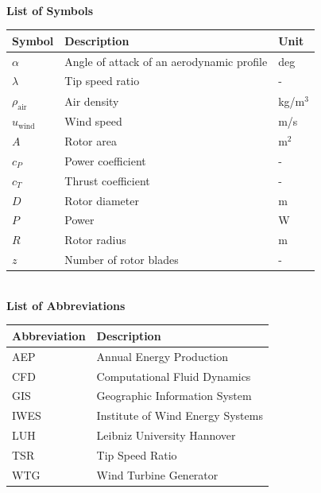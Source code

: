 
~\\[1.5cm]
{\huge\textbf{List of Symbols}}
\vspace{1.5cm}

\begin{tabularx}{0.9\textwidth}{l X l}
	\textbf{Symbol} & \textbf{Description} & \textbf{Unit} \\
	\hline
	$\alpha$                & Angle of attack of an aerodynamic profile       & deg     \\
	$\lambda$              & Tip speed ratio          & -        \\
	$\rho_{\text{air}}$    & Air density                                    & kg/m$^3$ \\
	$u_{\text{wind}}$      & Wind speed                           & m/s      \\
	$A$                    & Rotor area              & m$^2$    \\
	$c_P$                  & Power coefficient                         & -        \\
	$c_T$                  & Thrust coefficient                            & -        \\
	$D$                    & Rotor diameter                            & m \\
	$P$                    & Power        & W        \\
	$R$                    & Rotor radius                                 & m        \\
	$z$                    & Number of rotor blades                          & -        \\
\end{tabularx}

\clearpage


~\\[1.5cm]
{\huge\textbf{List of Abbreviations}}
\vspace{1.5cm}

\begin{tabularx}{0.9\textwidth}{l X}
	\textbf{Abbreviation} & \textbf{Description} \\
	\hline
	AEP & Annual Energy Production \\
	CFD & Computational Fluid Dynamics \\
	GIS & Geographic Information System \\
	IWES & Institute of Wind Energy Systems \\
	LUH & Leibniz University Hannover \\
	TSR & Tip Speed Ratio \\
	WTG & Wind Turbine Generator \\
\end{tabularx}

\clearpage
